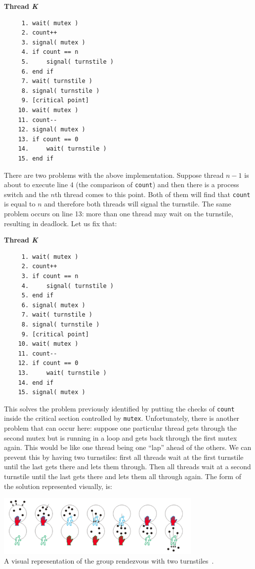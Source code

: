 \textbf{Thread \textit{K}}\vspace{-2em}
  \begin{verbatim}
	 1. wait( mutex )
	 2. count++
	 3. signal( mutex )
	 4. if count == n
	 5.     signal( turnstile )
	 6. end if
	 7. wait( turnstile )
	 8. signal( turnstile )
	 9. [critical point]
	10. wait( mutex )
	11. count--
	12. signal( mutex )
	13. if count == 0
	14.     wait( turnstile )
	15. end if
  \end{verbatim}
\vspace{-2em}

There are two problems with the above implementation. Suppose thread $n-1$ is about to execute line 4 (the comparison of \texttt{count}) and then there is a process switch and the $n$th thread comes to this point. Both of them will find that \texttt{count} is equal to $n$ and therefore both threads will signal the turnstile. The same problem occurs on line 13: more than one thread may wait on the turnstile, resulting in deadlock. Let us fix that:


\textbf{Thread \textit{K}}\vspace{-2em}
  \begin{verbatim}
	 1. wait( mutex )
	 2. count++
	 3. if count == n
	 4.     signal( turnstile )
	 5. end if
	 6. signal( mutex )
	 7. wait( turnstile )
	 8. signal( turnstile )
	 9. [critical point]
	10. wait( mutex )
	11. count--
	12. if count == 0
	13.     wait( turnstile )
	14. end if
	15. signal( mutex )
  \end{verbatim}
\vspace{-2em}

This solves the problem previously identified by putting the checks of \texttt{count} inside the critical section controlled by \texttt{mutex}. Unfortunately, there is another problem that can occur here: suppose one particular thread gets through the second mutex but is running in a loop and gets back through the first mutex again. This would be like one thread being one ``lap'' ahead of the others. We can prevent this by having two turnstiles: first all threads wait at the first turnstile until the last gets there and lets them through. Then all threads wait at a second turnstile until the last gets there and lets them all through again. The form of the solution represented visually, is:

\begin{center}
\includegraphics[width=0.75\textwidth]{images/reusable-barrier.png}\\
	A visual representation of the group rendezvous with two turnstiles~\cite{mte241}.
\end{center}

